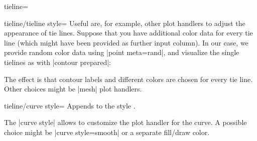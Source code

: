 \begin{plottype}{tieline=}
\begin{pgfplotskey}{tieline/tieline style=}
	Useful  are, for example, other plot handlers to adjust the appearance of tie lines. Suppose that you have additional color data for every tie line (which might have been provided as further input column). In our case, we provide random color data using |point meta=rand|, and visualize the single tielines as with |contour prepared|:
\begin{codeexample}[]
\end{codeexample}
	\noindent The effect is that contour labels and different colors are chosen for every tie line. Other choices might be |mesh| plot handlers.
\end{pgfplotskey}

\begin{pgfplotskey}{tieline/curve style=}
	Appends  to the style .

	The |curve style| allows to customize the plot handler for the curve. A possible choice might be |curve style={smooth}| or a separate fill/draw color.
\end{pgfplotskey}
\end{plottype}
